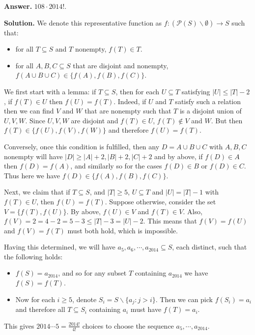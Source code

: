 \documentclass[11pt,a4paper]{article}
\begin{document}
\begin{enumerate}
	\textbf{Answer.} $108\cdot 2014!$. 
	
	\textbf{Solution.} We denote this representative function as $f: (\mathcal{P}(S)\backslash \emptyset)\to S$ such that: 
	\begin{itemize}
		\item for all $T\subseteq S$ and $T$ nonempty, $f(T)\in T$. 
		\item  for all $A, B, C\subseteq S$ that are disjoint and nonempty, $f(A\cup B\cup C)\in \{f(A), f(B), f(C)\}$.
	\end{itemize}
	We first start with a lemma: if $T\subseteq S$, then for each $U\subseteq T$ satisfying $|U|\le |T| - 2$, if $f(T)\in U$ then $f(U)=f(T)$. 
	Indeed, if $U$ and $T$ satisfy such a relation then we can find $V$ and $W$ that are nonempty such that $T$ is a disjoint union of $U, V, W$. Since $U, V, W$ are disjoint and $f(T)\in U$, $f(T)\not\in V$ and $W$. But then $f(T)\in \{f(U), f(V), f(W)\}$ and therefore $f(U)=f(T)$. 
	
	Conversely, once this condition is fulfilled, then any $D=A\cup B\cup C$ with $A, B, C$ nonempty will have $|D|\ge |A|+2, |B|+2, |C|+2$ and by above, if $f(D)\in A$ then $f(D)=f(A)$, and similarly so for the cases $f(D)\in B$ or $f(D)\in C$. Thus here we have $f(D)\in \{f(A), f(B), f(C)\}$. 
	
	Next, we claim that if $T\subseteq S$, and $|T|\ge 5$, $U\subseteq T$ and $|U|=|T|-1$ with $f(T)\in U$, then $f(U)=f(T)$. 
	Suppose otherwise, consider the set $V=\{f(T), f(U)\}$. By above, $f(U)\in V$ and $f(T)\in V$. Also, $f(V)=2=4-2=5-3\le |T|-3=|U|-2$. This means that $f(V)=f(U)$ and $f(V)=f(T)$ must both hold, which is impossible. 
	
	Having this determined, we will have $a_5, a_6, \cdots , a_{2014}\subseteq S$, each distinct, such that the following holds: 
	\begin{itemize}
		\item $f(S)=a_{2014}$, and so for any subset $T$ containing $a_{2014}$ we have $f(S)=f(T)$. 
		
		\item Now for each $i\ge 5$, denote $S_i=S\backslash\{a_{j}: j>i\}$. Then we can pick $f(S_i)=a_i$ and therefore all $T\subseteq S_i$ containing $a_i$ must have $f(T)=a_i$. 
	\end{itemize}
	This gives $2014\cdots 5=\frac{2014!}{4!}$ choices to choose the sequence $a_5, \cdots , a_{2014}$. 
	

\end{enumerate}
\end{document}
